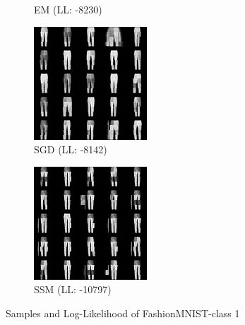 \begin{figure}[H]
\begin{subfigure}[b]{0.24\textwidth}
        \caption{EM (LL: -8230)}
    \end{subfigure}
    \begin{subfigure}[b]{0.24\textwidth}
        \centering
        \includegraphics[width=\textwidth]{figures/einsum/1fashion-mnist_SGD.png} 
        \caption{SGD (LL: -8142)}
    \end{subfigure}
    \begin{subfigure}[b]{0.24\textwidth}
        \centering
        \includegraphics[width=\textwidth]{figures/einsum/1fashion-mnist_SSM.png}
        \caption{SSM (LL: -10797)}
    \end{subfigure}
    \caption{Samples and Log-Likelihood of FashionMNIST-class 1}
\end{figure}

